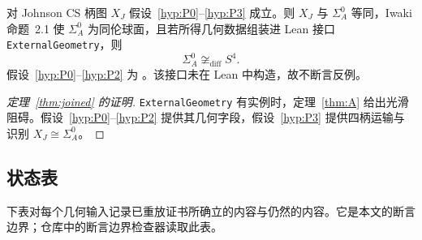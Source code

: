 \begin{theorem}[条件 trace-73 定理]\label{thm:joined}
对 Johnson CS 柄图 $X_J$ 假设~\ref{hyp:P0}--\ref{hyp:P3} 成立。则 $X_J$ 与 $\Sigma_A^0$ 等同，Iwaki 命题~2.1 使 $\Sigma_A^0$ 为同伦球面，且若所得几何数据组装进 Lean 接口 \texttt{ExternalGeometry}，则
\[
\Sigma_A^0\not\cong_{\mathrm{diff}}S^4.
\]
假设~\ref{hyp:P0}--\ref{hyp:P2} 为 \Open。该接口未在 Lean 中构造，故不断言反例。
\end{theorem}

\begin{proof}[定理~\ref{thm:joined} 的证明]
\texttt{ExternalGeometry} 有实例时，定理~\ref{thm:A} 给出光滑阻碍。假设~\ref{hyp:P0}--\ref{hyp:P2} 提供其几何字段，假设~\ref{hyp:P3} 提供四柄运输与识别 $X_J\cong\Sigma_A^0$。
\end{proof}

\subsection{状态表}\label{sec:status-table}

下表对每个几何输入记录已重放证书所确立的内容与仍然\Open 的内容。它是本文的断言边界；仓库中的断言边界检查器读取此表。

